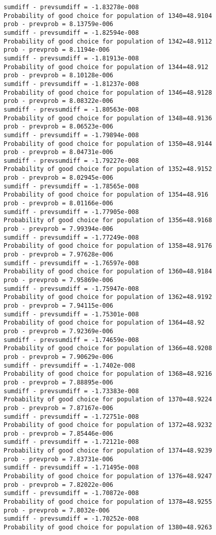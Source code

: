 \documentclass[11pt,onecolumn]{article}
\begin{document}
\begin{verbatim}
sumdiff - prevsumdiff = -1.83278e-008
Probability of good choice for population of 1340=48.9104
prob - prevprob = 8.13759e-006
sumdiff - prevsumdiff = -1.82594e-008
Probability of good choice for population of 1342=48.9112
prob - prevprob = 8.1194e-006
sumdiff - prevsumdiff = -1.81913e-008
Probability of good choice for population of 1344=48.912
prob - prevprob = 8.10128e-006
sumdiff - prevsumdiff = -1.81237e-008
Probability of good choice for population of 1346=48.9128
prob - prevprob = 8.08322e-006
sumdiff - prevsumdiff = -1.80563e-008
Probability of good choice for population of 1348=48.9136
prob - prevprob = 8.06523e-006
sumdiff - prevsumdiff = -1.79894e-008
Probability of good choice for population of 1350=48.9144
prob - prevprob = 8.04731e-006
sumdiff - prevsumdiff = -1.79227e-008
Probability of good choice for population of 1352=48.9152
prob - prevprob = 8.02945e-006
sumdiff - prevsumdiff = -1.78565e-008
Probability of good choice for population of 1354=48.916
prob - prevprob = 8.01166e-006
sumdiff - prevsumdiff = -1.77905e-008
Probability of good choice for population of 1356=48.9168
prob - prevprob = 7.99394e-006
sumdiff - prevsumdiff = -1.77249e-008
Probability of good choice for population of 1358=48.9176
prob - prevprob = 7.97628e-006
sumdiff - prevsumdiff = -1.76597e-008
Probability of good choice for population of 1360=48.9184
prob - prevprob = 7.95869e-006
sumdiff - prevsumdiff = -1.75947e-008
Probability of good choice for population of 1362=48.9192
prob - prevprob = 7.94115e-006
sumdiff - prevsumdiff = -1.75301e-008
Probability of good choice for population of 1364=48.92
prob - prevprob = 7.92369e-006
sumdiff - prevsumdiff = -1.74659e-008
Probability of good choice for population of 1366=48.9208
prob - prevprob = 7.90629e-006
sumdiff - prevsumdiff = -1.7402e-008
Probability of good choice for population of 1368=48.9216
prob - prevprob = 7.88895e-006
sumdiff - prevsumdiff = -1.73383e-008
Probability of good choice for population of 1370=48.9224
prob - prevprob = 7.87167e-006
sumdiff - prevsumdiff = -1.72751e-008
Probability of good choice for population of 1372=48.9232
prob - prevprob = 7.85446e-006
sumdiff - prevsumdiff = -1.72121e-008
Probability of good choice for population of 1374=48.9239
prob - prevprob = 7.83731e-006
sumdiff - prevsumdiff = -1.71495e-008
Probability of good choice for population of 1376=48.9247
prob - prevprob = 7.82022e-006
sumdiff - prevsumdiff = -1.70872e-008
Probability of good choice for population of 1378=48.9255
prob - prevprob = 7.8032e-006
sumdiff - prevsumdiff = -1.70252e-008
Probability of good choice for population of 1380=48.9263

\end{verbatim}
\end{document}
